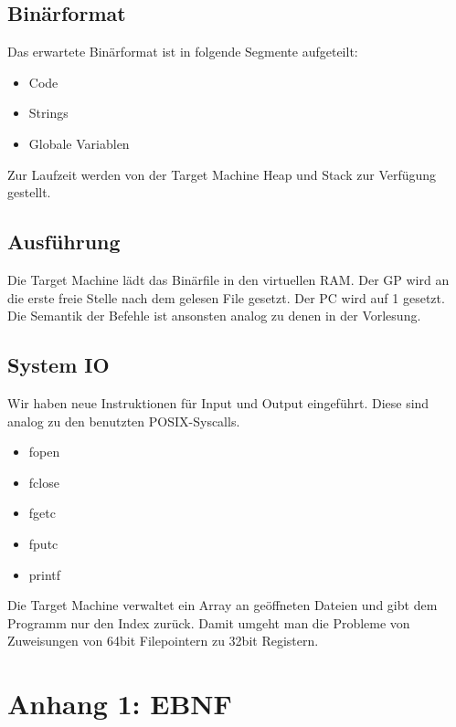 \documentclass[a4paper,12pt]{article}
\begin{document}
	\subsection{Binärformat}
	Das erwartete Binärformat ist in folgende Segmente aufgeteilt:
	\begin{itemize}
		\item Code
		\item Strings
		\item Globale Variablen
	\end{itemize}

	Zur Laufzeit werden von der Target Machine Heap und Stack zur Verfügung gestellt.

	\subsection{Ausführung}
	Die Target Machine lädt das Binärfile in den virtuellen RAM.
	Der GP wird an die erste freie Stelle nach dem gelesen File gesetzt.
	Der PC wird auf 1 gesetzt.
	Die Semantik der Befehle ist ansonsten analog zu denen in der Vorlesung.

	\subsection{System IO}
	Wir haben neue Instruktionen für Input und Output eingeführt.
	Diese sind analog zu den benutzten POSIX-Syscalls.
	\begin{itemize}
		\item fopen
		\item fclose
		\item fgetc
		\item fputc
		\item printf
	\end{itemize}
	Die Target Machine verwaltet ein Array an geöffneten Dateien und gibt dem Programm nur den Index zurück.
	Damit umgeht man die Probleme von Zuweisungen von 64bit Filepointern zu 32bit Registern.

	\newpage
	\section{Anhang 1: EBNF}
	
\end{document}
